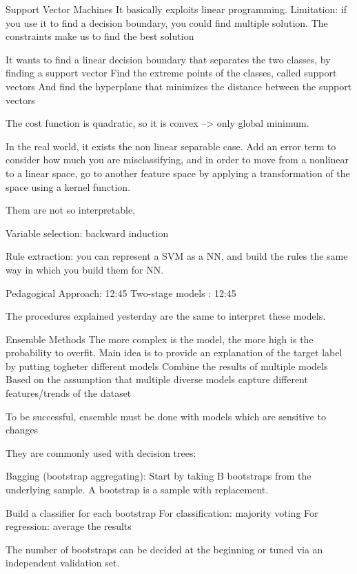 \iffalse
Support Vector Machines
    It basically exploits linear programming.
    Limitation: if you use it to find a decision boundary, you could find multiple solution.
        The constraints make us to find the best solution 

    It wants to find a linear decision boundary that separates the two classes, by finding a support vector 
    Find the extreme points of the classes, called support vectors
    And find the hyperplane that minimizes the distance between the support vectors 

    The cost function is quadratic, so it is convex --> only global minimum.

    In the real world, it exists the non linear separable case.
    Add an error term to consider how much you are misclassifying, and in order
    to move from a nonlinear to a linear space, go to another feature space 
    by applying a transformation of the space using a kernel function.

    Them are not so interpretable, 
    
    Variable selection: backward induction 

    Rule extraction: you can represent a SVM as a NN, and build the rules
    the same way in which you build them for NN.

    Pedagogical Approach: 12:45
    Two-stage models : 12:45

    The procedures explained yesterday are the same to interpret these models.

Ensemble Methods 
    The more complex is the model, the more high is the probability to overfit.
    Main idea is to provide an explanation of the target label by putting togheter different models 
    Combine the results of multiple models 
    Based on the assumption that multiple diverse models capture different features/trends of the dataset

    To be successful, ensemble must be done with models which are sensitive to changes

    They are commonly used with decision trees:

    Bagging (bootstrap aggregating):
        Start by taking B bootstraps from the underlying sample.
        A bootstrap is a sample with replacement.

        Build a classifier for each bootstrap
        For classification: majority voting 
        For regression: average the results

        The number of bootstraps can be decided at the beginning or tuned via 
        an independent validation set.

